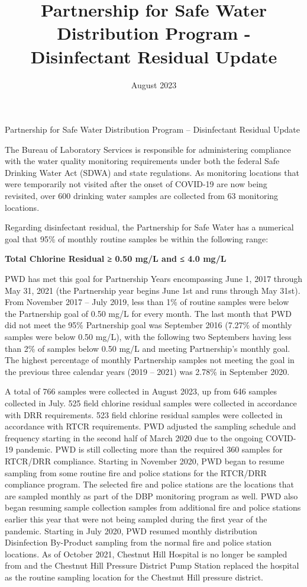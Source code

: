 \documentclass[
]{article}
\title{Partnership for Safe Water Distribution Program - Disinfectant
Residual Update}
\author{}
\date{\vspace{-2.5em}August 2023}
\begin{document}
\maketitle

Partnership for Safe Water Distribution Program -- Disinfectant Residual
Update

The Bureau of Laboratory Services is responsible for administering
compliance with the water quality monitoring requirements under both the
federal Safe Drinking Water Act (SDWA) and state regulations. As
monitoring locations that were temporarily not visited after the onset
of COVID-19 are now being revisited, over 600 drinking water samples are
collected from 63 monitoring locations.

Regarding disinfectant residual, the Partnership for Safe Water has a
numerical goal that 95\% of monthly routine samples be within the
following range:

\textbf{Total Chlorine Residual ≥ 0.50 mg/L and ≤ 4.0 mg/L}

PWD has met this goal for Partnership Years encompassing June 1, 2017
through May 31, 2021 (the Partnership year begins June 1st and runs
through May 31st). From November 2017 -- July 2019, less than 1\% of
routine samples were below the Partnership goal of 0.50 mg/L for every
month. The last month that PWD did not meet the 95\% Partnership goal
was September 2016 (7.27\% of monthly samples were below 0.50 mg/L),
with the following two Septembers having less than 2\% of samples below
0.50 mg/L and meeting Partnership's monthly goal. The highest percentage
of monthly Partnership samples not meeting the goal in the previous
three calendar years (2019 -- 2021) was 2.78\% in September 2020.

A total of 766 samples were collected in August 2023, up from 646
samples collected in July. 525 field chlorine residual samples were
collected in accordance with DRR requirements. 523 field chlorine
residual samples were collected in accordance with RTCR requirements.
PWD adjusted the sampling schedule and frequency starting in the second
half of March 2020 due to the ongoing COVID-19 pandemic. PWD is still
collecting more than the required 360 samples for RTCR/DRR compliance.
Starting in November 2020, PWD began to resume sampling from some
routine fire and police stations for the RTCR/DRR compliance program.
The selected fire and police stations are the locations that are sampled
monthly as part of the DBP monitoring program as well. PWD also began
resuming sample collection samples from additional fire and police
stations earlier this year that were not being sampled during the first
year of the pandemic. Starting in July 2020, PWD resumed monthly
distribution Disinfection By-Product sampling from the normal fire and
police station locations. As of October 2021, Chestnut Hill Hospital is
no longer be sampled from and the Chestnut Hill Pressure District Pump
Station replaced the hospital as the routine sampling location for the
Chestnut Hill pressure district.
\end{document}

